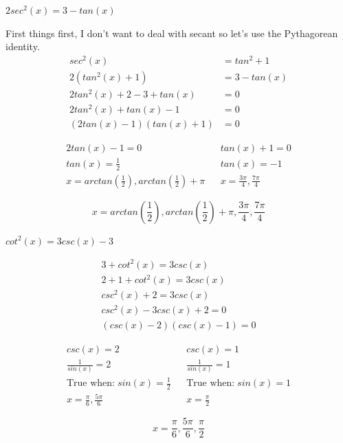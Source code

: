 \documentclass[10pt,letterpaper]{amspset}
\begin{document}
\begin{problem}[28]
    $2sec^2(x) = 3 - tan(x)$
\end{problem}

\begin{solution}
    First things first, I don't want to deal with secant so let's use the Pythagorean identity.
    \begin{align}
        sec^2(x) &= tan^2 + 1 \\
        2(tan^2(x) + 1) &= 3 - tan(x) \\ 
        2tan^2(x) + 2 - 3 + tan(x) &= 0 \\
        2tan^2(x) + tan(x) -1 &= 0 \\
        (2tan(x) - 1)(tan(x) + 1) &= 0
    \end{align}
    
    \begin{align}
        2 tan(x) - 1 = 0 && tan(x) + 1 = 0 \\
        tan(x) = \frac{1}{2} && tan(x) = -1 \\
        x = arctan \left( \frac{1}{2} \right), arctan \left( \frac{1}{2} \right) + \pi && x = \frac{3\pi}{4}, \frac{7\pi}{4} 
    \end{align}
    
    \[\boxed{ x = arctan \left( \frac{1}{2} \right), arctan \left( \frac{1}{2} \right) + \pi, \frac{3\pi}{4}, \frac{7\pi}{4}  }\]
\end{solution}


\pagebreak


\begin{problem}[30]
    $cot^2(x) = 3 csc(x) - 3$
\end{problem}

\begin{solution}
    \begin{align}
        3 + cot^2(x) = 3 csc(x) \\
        2 + 1 + cot^2(x) = 3csc(x) \\
        csc^2(x) + 2 = 3csc(x) \\
        csc^2(x) - 3csc(x) + 2 = 0 \\
        (csc(x) - 2)(csc(x) - 1) = 0
    \end{align}
    
    \begin{align}
        csc(x) = 2 && csc(x) = 1 \\
        \frac{1}{sin(x)} = 2 && \frac{1}{sin(x)} = 1 \\
        \text{True when:} \; sin(x) = \frac{1}{2} && \text{True when:} \; sin(x) = 1 \\
        x = \frac{\pi}{6}, \frac{5\pi}{6} && x = \frac{\pi}{2}
    \end{align}
    
    \[\boxed{ x = \frac{\pi}{6}, \frac{5\pi}{6},  \frac{\pi}{2}}\]
\end{solution}
\end{document}
